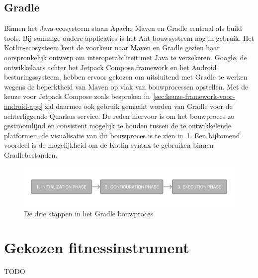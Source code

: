 \subsection{Gradle}
\label{subsec:gradle}
Binnen het Java-ecosysteem staan Apache Maven en Gradle centraal als build tools.
Bij sommige oudere applicaties is het Ant-bouwsysteem nog in gebruik.
Het Kotlin-ecosysteem kent de voorkeur naar Maven en Gradle gezien haar oorspronkelijk ontwerp om interoperabiliteit met Java te verzekeren.
Google, de ontwikkelaars achter het Jetpack Compose framework en het Android besturingssysteem, hebben ervoor gekozen om uitsluitend met Gradle te werken wegens de beperktheid van Maven op vlak van bouwprocessen opstellen.
Met de keuze voor Jetpack Compose zoals besproken in~\ref{sec:keuze-framework-voor-android-app} zal daarmee ook gebruik gemaakt worden van Gradle voor de achterliggende Quarkus service.
De reden hiervoor is om het bouwproces zo gestroomlijnd en consistent mogelijk te houden tussen de te ontwikkelende platformen, de visualisatie van dit bouwproces is te zien in~\ref{fig:visualisatie-gradle-bouwproces}.
Een bijkomend voordeel is de mogelijkheid om de Kotlin-syntax te gebruiken binnen Gradlebestanden.
\begin{figure}
    \includegraphics[width=1\linewidth]{images/gradle-buildprocess}
    \caption{De drie stappen in het Gradle bouwproces~\autocite{Gradle}}
    \label{fig:visualisatie-gradle-bouwproces}
\end{figure}

\section{Gekozen fitnessinstrument}
\label{sec:gekozen-fitnessinstrument}
TODO